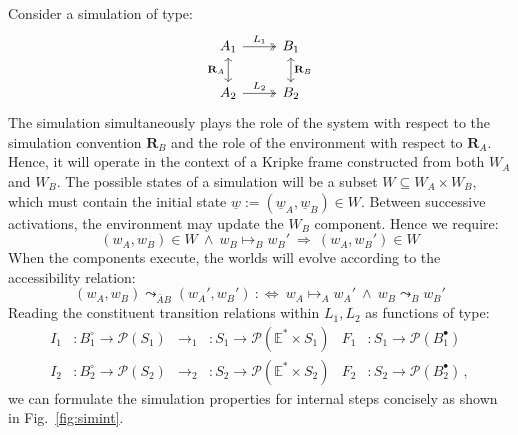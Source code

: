 \documentclass[acmsmall,screen,review,anonymous]{acmart}
\newcommand{\que}{\circ}
\newcommand{\ans}{\bullet}
\newcommand{\intl}[1]{\underline{#1}}
\begin{document}
Consider a simulation of type:
\[
\begin{tikzcd}
  A_1 \ar[r, twoheadrightarrow, "L_1"] \ar[d, leftrightarrow, "\mathbf{R}_A"'] &
  B_1 \ar[d, leftrightarrow, "\mathbf{R}_B"] \\
  A_2 \ar[r, twoheadrightarrow, "L_2"] & B_2
\end{tikzcd}
\]
The simulation simultaneously
plays the role of the system with respect to
the simulation convention $\mathbf{R}_B$ and
the role of the environment with respect to $\mathbf{R}_A$.
Hence,
it will operate in the context of a Kripke frame
constructed from both $W_A$ and $W_B$.
The possible states of a simulation will be a subset
$W \subseteq W_A \times W_B$,
which must contain
the initial state $\intl{w} := (\intl{w}_A, \intl{w}_B) \in W$.
Between successive activations,
the environment may update the $W_B$ component.
Hence we require:
\[
  (w_A, w_B) \in W \:\wedge\:
  w_B \mapsto_B w_B' \:\Rightarrow\:
  (w_A, w_B') \in W
\]
When the components execute,
the worlds will evolve according to
the accessibility relation:
\[
  (w_A, w_B) \leadsto_{\bar{A}B} (w_A', w_B') \::\Leftrightarrow\:
  w_A \mapsto_A w_A' \:\wedge\: w_B \leadsto_B w_B'
\]
Reading the constituent transition relations
within $L_1, L_2$ as functions of type:
\begin{align*}
  I_1 &: B_1^\que \rightarrow \mathcal{P}(S_1) &
  {\rightarrow_1} &: S_1 \rightarrow \mathcal{P}(\mathbb{E}^* \times S_1) &
  F_1 &: S_1 \rightarrow \mathcal{P}(B_1^\ans)
  \\
  I_2 &: B_2^\que \rightarrow \mathcal{P}(S_2) &
  {\rightarrow_2} &: S_2 \rightarrow \mathcal{P}(\mathbb{E}^* \times S_2) &
  F_2 &: S_2 \rightarrow \mathcal{P}(B_2^\ans)
  \,,
\end{align*}
we can formulate the simulation properties for internal steps
concisely as shown in Fig.~\ref{fig:simint}.
\end{document}
